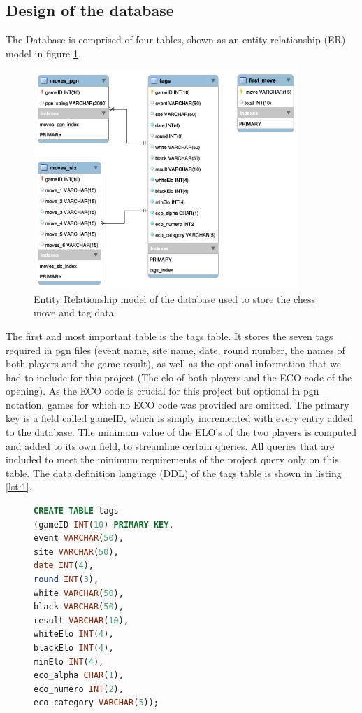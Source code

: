 \documentclass{article}
\begin{document}
\subsection{Design of the database}
The Database is comprised of four tables, shown as an entity relationship
(ER) model in figure \ref{figure:4}.

\begin{figure}[h]
	\includegraphics[width=10cm]{EER}
	\caption{Entity Relationship model of the database used to store the
	chess move and tag data}
	\label{figure:4}
\end{figure}

The first and most important table is the tags table.  It stores the seven
tags required in pgn files (event name, site name, date, round number, the
names of both players and the game result), as well as the optional information
that we had to include for this project (The elo of both players and the
ECO code of the opening). As the ECO code is crucial for this project but
optional in pgn notation, games for which no ECO code was provided are
omitted. The primary key is a field called gameID, which is simply incremented
with every entry added to the database. The minimum value of the ELO's of
the two players is computed and added to its own field, to streamline
certain queries.  All queries that are included to meet the minimum
requirements of the project query only on this table.
The data definition language (DDL) of the tags table is shown in listing
\ref{lst:1}.

\begin{figure}[h]
	\begin{lstlisting}[label={lst:1}, language=sql, frame=single, caption=DDL describing the structure of the tags table]
CREATE TABLE tags
(gameID INT(10) PRIMARY KEY,
event VARCHAR(50),
site VARCHAR(50),
date INT(4),
round INT(3),
white VARCHAR(50),
black VARCHAR(50),
result VARCHAR(10),
whiteElo INT(4),
blackElo INT(4),
minElo INT(4),
eco_alpha CHAR(1),
eco_numero INT(2),
eco_category VARCHAR(5));
	\end{lstlisting}
\end{figure}
\end{document}
